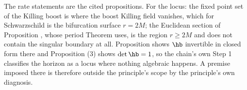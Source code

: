The rate statements are the cited propositions. For the locus: the fixed point set of the Killing boost is where the boost Killing field vanishes, which for Schwarzschild is the bifurcation surface $r = 2M$; the Euclidean section of Proposition , whose period Theorem  uses, is the region $r \geq 2M$ and does not contain the singular boundary at all. Proposition  shows $\hb$ invertible in closed form there and Proposition (3) shows $\det\hb = 1$, so the chain's own Step 1 classifies the horizon as a locus where nothing algebraic happens. A premise imposed there is therefore outside the principle's scope by the principle's own diagnosis.
